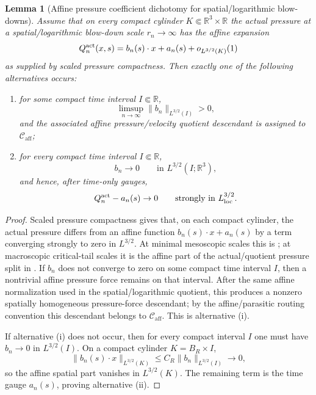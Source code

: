 \documentclass[11pt]{amsart}
\numberwithin{equation}{section}
\theoremstyle{plain}
\newtheorem{lemma}[lemma]{Lemma}
\theoremstyle{definition}
\theoremstyle{remark}
\newcommand{\loc}{\mathrm{loc}}
\newcommand{\Caff}{\mathcal C_{\mathrm{aff}}}
\begin{document}
\begin{lemma}[Affine pressure coefficient dichotomy for spatial/logarithmic blow-downs]
\label{lem:affine-pressure-coefficient-dichotomy}
\label{lem:affine-pressure-coefficient-dichotomy-general}
Assume that on every compact cylinder \(K\Subset\mathbb R^3\times\mathbb R\)
the actual pressure at a spatial/logarithmic blow-down scale \(r_n\to\infty\)
has the affine expansion
\[
   Q_n^{\rm act}(x,s)
   =
   b_n(s)\cdot x+a_n(s)+o_{L^{3/2}(K)}(1)
\]
as supplied by scaled pressure compactness.  Then exactly one of the following
alternatives occurs:
\begin{enumerate}[label=\textup{(\roman*)}]
   \item for some compact time interval \(I\Subset\mathbb R\),
   \[
      \limsup_{n\to\infty}\|b_n\|_{L^{3/2}(I)}>0,
   \]
   and the associated affine pressure/velocity quotient descendant is assigned
   to \(\Caff\);
   \item for every compact time interval \(I\Subset\mathbb R\),
   \[
      b_n\to0
      \qquad\text{in }L^{3/2}(I;\mathbb R^3),
   \]
   and hence, after time-only gauges,
   \[
      Q_n^{\rm act}-a_n(s)\to0
      \qquad\text{strongly in }L^{3/2}_{\loc}.
   \]
\end{enumerate}
\end{lemma}

\begin{proof}
Scaled pressure compactness gives that, on each compact cylinder, the actual
pressure differs from an affine function \(b_n(s)\cdot x+a_n(s)\) by a term
converging strongly to zero in \(L^{3/2}\).  At minimal mesoscopic scales this is
; at macroscopic critical-tail
scales it is the affine part of the actual/quotient pressure split in
.  If \(b_n\) does not converge to
zero on some compact time interval \(I\), then a nontrivial affine pressure
force remains on that interval.  After the same affine normalization used in
the spatial/logarithmic quotient, this produces a nonzero spatially homogeneous
pressure-force descendant; by the affine/parasitic routing convention this
descendant belongs to \(\Caff\).  This is alternative \textup{(i)}.

If alternative \textup{(i)} does not occur, then for every compact interval
\(I\) one must have \(b_n\to0\) in \(L^{3/2}(I)\).  On a compact cylinder
\(K=B_R\times I\),
\[
   \|b_n(s)\cdot x\|_{L^{3/2}(K)}
   \le C_R\|b_n\|_{L^{3/2}(I)}\to0,
\]
so the affine spatial part vanishes in \(L^{3/2}(K)\).  The remaining term is
the time gauge \(a_n(s)\), proving alternative \textup{(ii)}.
\end{proof}
\end{document}
